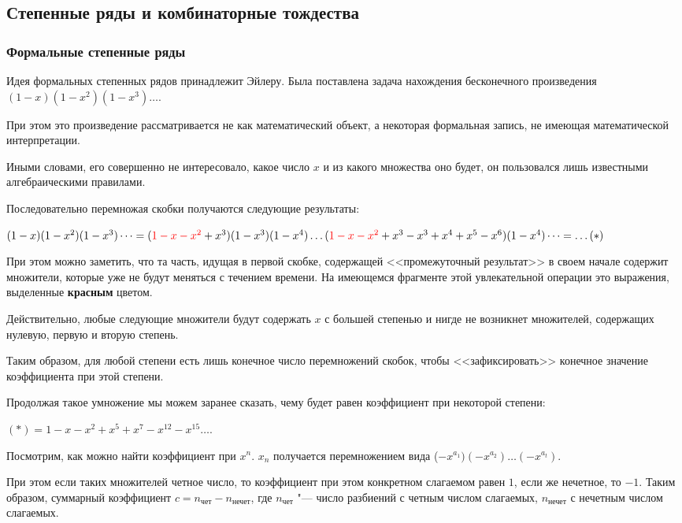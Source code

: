 \subsection{Степенные ряды и комбинаторные тождества}

\subsubsection{Формальные степенные ряды}

Идея формальных степенных рядов принадлежит Эйлеру. Была
поставлена задача нахождения бесконечного произведения
$(1 - x)(1 - x^2)(1 - x^3) \dots$.

При этом это произведение рассматривается не как математический объект,
а некоторая формальная запись, не имеющая математической интерпретации.

Иными словами, его совершенно не интересовало, какое число $x$ и из какого
множества оно будет, он пользовался лишь известными алгебраическими правилами.

Последовательно перемножая скобки получаются следующие результаты:

$(1 - x) (1 - x^2) (1 - x^3) \dots = (\textcolor{red}{1 - x - x^2} + x^3) (1 - x^3) (1 - x^4) \dots 
(\textcolor{red}{1 - x - x^2} + x^3 - x^3 + x^4 + x^5 - x^6)(1 - x^4) \dots = \dots (*)$

При этом можно заметить, что та часть, идущая в первой скобке, содержащей
<<промежуточный результат>> в своем начале содержит множители, которые
уже не будут меняться с течением времени. На имеющемся фрагменте
этой увлекательной операции это выражения, выделенные \textbf{красным} цветом. 

Действительно, любые
следующие множители будут содержать $x$ с большей степенью и нигде не возникнет
множителей, содержащих нулевую, первую и вторую степень. 

Таким образом, для любой степени есть лишь конечное число перемножений скобок,
чтобы <<зафиксировать>> конечное значение коэффициента при этой степени.

Продолжая такое умножение мы можем заранее сказать, чему будет равен коэффициент
при некоторой степени:

$(*) = 1 - x - x^2 + x^5 + x^7  - x^{12} - x^{15} \dots $.

Посмотрим, как можно найти коэффициент при $x^n$. $x_n$ получается
перемножением вида ($-x^{a_1})  (-x^{a_2}) \dots (-x^{a_t})$.

При этом если таких множителей четное число, то коэффициент при этом конкретном
слагаемом равен $1$, если же нечетное, то $-1$. Таким образом,
суммарный коэффициент $c = n_\text{чет} - n_\text{нечет}$, где $n_\text{чет}$ "--- 
число разбиений с четным числом слагаемых, $n_\text{нечет}$ с нечетным числом слагаемых.


